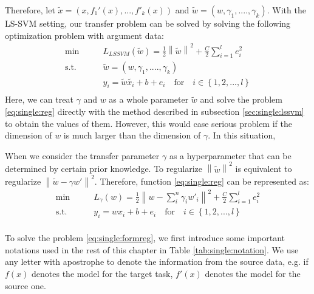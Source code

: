 Therefore, let $\tilde{x} = (x,f_1'(x),...,f'_k(x))$ and $\tilde{w} = (w,\gamma_1,....,\gamma_k)$.
With the LS-SVM setting, our transfer problem can be solved by solving the following optimization problem with argument data:
\begin{equation}\label{eq:single:reg}
	\begin{aligned}
	\min \qquad& L_{LSSVM}(\tilde{w}) = \frac{1}{2}{\left\| \tilde{w} \right\|^2} + \frac{C}{2}\sum\limits_{i = 1}^l {{e_i ^2}}\\
	\text{s.t.}\qquad& \tilde{w} = (w,\gamma_1,....,\gamma_k)\\
	&{y_i} = \tilde{w} {\tilde{x_i}} + b + {e _i} \quad   \text{for} \quad i \in \left\{ {1,2,...,l} \right\}\\
	\end{aligned}
\end{equation}
Here, we can treat $\gamma$ and $w$ as a whole parameter $\tilde w$ and solve the problem \eqref{eq:single:reg} directly with the method described in subsection \ref{sec:single:lssvm} to obtain the values of them. However, this would case serious problem if the dimension of $w$ is much larger than the dimension of $\gamma$. In this situation, 

 
When we consider the transfer parameter $\gamma$ as a hyperparameter that can be determined by certain prior knowledge. To regularize  $\left\|\tilde{w}\right\|^2$ is equivalent to regularize $\left\|\tilde{w}-\gamma w'\right\|^2$. Therefore, function \eqref{eq:single:reg} can be represented as:
\begin{equation}\label{eq:single:formreg}
\begin{aligned}
\min \qquad& L_{\gamma}(w) = \frac{1}{2}{\left\| {w}-\sum\limits_{i}^{n}\gamma_i w'_i \right\|^2} + \frac{C}{2}\sum\limits_{i = 1}^l {{e_i ^2}}\\
\text{s.t.}\qquad& {y_i} = {w} {{x_i}} + b + {e _i} \quad   \text{for} \quad i \in \left\{ {1,2,...,l} \right\}\\
\end{aligned}
\end{equation}

To solve the problem \eqref{eq:single:formreg}, we first introduce some important notations used in the rest of this chapter in Table \ref{tab:single:notation}. We use any letter with apostrophe to denote the information from the source data, e.g. if $f(x)$ denotes the model for the target task, $f'(x)$ denotes the model for the source one.

